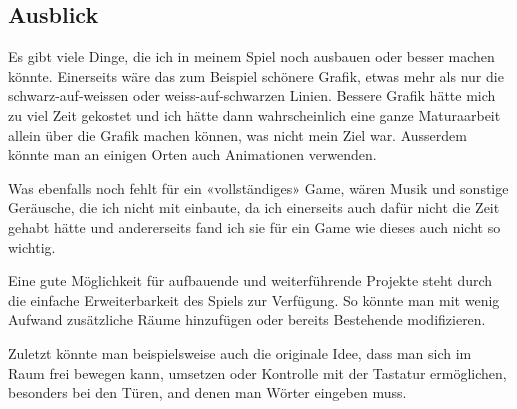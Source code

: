 \subsection{Ausblick}
Es gibt viele Dinge, die ich in meinem Spiel noch ausbauen oder besser machen könnte. Einerseits wäre das zum Beispiel schönere Grafik, etwas mehr als nur die schwarz-auf-weissen oder weiss-auf-schwarzen Linien. Bessere Grafik hätte mich zu viel Zeit gekostet und ich hätte dann wahrscheinlich eine ganze Maturaarbeit allein über die Grafik machen können, was nicht mein Ziel war. Ausserdem könnte man an einigen Orten auch Animationen verwenden.

Was ebenfalls noch fehlt für ein «vollständiges» Game, wären Musik und sonstige Geräusche, die ich nicht mit einbaute, da ich einerseits auch dafür nicht die Zeit gehabt hätte und andererseits fand ich sie für ein Game wie dieses auch nicht so wichtig.

Eine gute Möglichkeit für aufbauende und weiterführende Projekte steht durch die einfache Erweiterbarkeit des Spiels zur Verfügung. So könnte man mit wenig Aufwand zusätzliche Räume hinzufügen oder bereits Bestehende modifizieren.

Zuletzt könnte man beispielsweise auch die originale Idee, dass man sich im Raum frei bewegen kann, umsetzen oder Kontrolle mit der Tastatur ermöglichen, besonders bei den Türen, and denen man Wörter eingeben muss.

